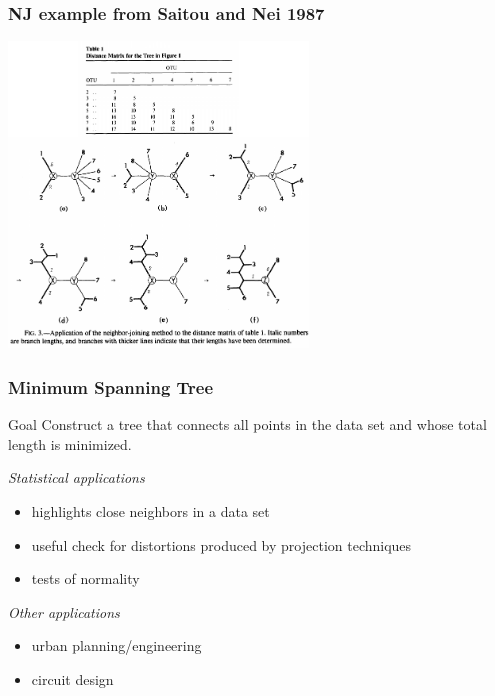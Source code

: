 \documentclass{beamer}
\begin{document}
\begin{frame}
\frametitle{NJ example from Saitou and Nei 1987}
\begin{center}
\includegraphics[height=3.2in]{saitou-nj-example.pdf}    
\end{center}
\end{frame}



\begin{frame}
  \frametitle{Minimum Spanning Tree}

\begin{block}{Goal}
Construct a tree that connects all points in the data set and whose total length is minimized.
\end{block}

\emph{Statistical applications}
\begin{itemize}
    \item highlights close neighbors in a data set
    \item useful check for distortions produced by projection techniques
    \item tests of normality
\end{itemize}
\medskip

\emph{Other applications}
\begin{itemize}
    \item urban planning/engineering
    \item circuit design
\end{itemize}

\end{frame}
\end{document}
